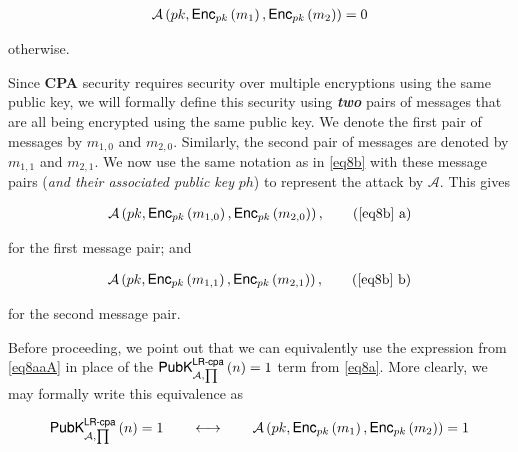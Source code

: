 \documentclass[../CryptoFinal.tex]{subfiles}
\begin{document}
\begin{flushleft}
\begin{align}
  \mathcal{A} \left( pk,  \text{{\fontfamily{phv}\selectfont Enc}}_{pk} \left( m_1 \right), \text{{\fontfamily{phv}\selectfont Enc}}_{pk} \left( m_2 \right) \right) = 0 \label{eq8aaB}
\end{align}

otherwise. \newline


Since \textbf{CPA} security requires security over multiple encryptions using the same public key, we will formally define this security using \textbf{\emph{two}} pairs of messages that are all being encrypted using the same public key.  We denote the first pair of messages by $m_{1, 0}$ and $m_{2, 0}$.  Similarly, the second pair of messages are denoted by  $m_{1, 1}$ and $m_{2, 1}$.  We now use the same notation as in \ref{eq8b} with these message pairs (\emph{and their associated public key} $ph$) to represent the attack by $\mathcal{A}$.  This gives

\begin{align}
  \mathcal{A} \left( pk,  \text{{\fontfamily{phv}\selectfont Enc}}_{pk} \left( m_{1, 0} \right), \text{{\fontfamily{phv}\selectfont Enc}}_{pk} \left( m_{2, 0} \right) \right), \tag{\ref{eq8b} a} \label{eq8b1}
\end{align}

for the first message pair; and 

\begin{align}
  \mathcal{A} \left( pk,  \text{{\fontfamily{phv}\selectfont Enc}}_{pk} \left( m_{1, 1} \right), \text{{\fontfamily{phv}\selectfont Enc}}_{pk} \left( m_{2, 1} \right) \right), \tag{\ref{eq8b} b} \label{eq8b2}
\end{align}
\setcounter{equation}{2}

for the second message pair. \newline


Before proceeding, we point out that we can equivalently use the expression from \ref{eq8aaA} in place of the $\text{{\fontfamily{phv}\selectfont PubK}}^{\text{{\fontfamily{phv}\selectfont LR-cpa}}}_{\mathcal{A}, \prod} \left( n \right) = 1$ term from \ref{eq8a}.  More clearly, we may formally write this equivalence as

\begin{align*}
  \text{{\fontfamily{phv}\selectfont PubK}}^{\text{{\fontfamily{phv}\selectfont LR-cpa}}}_{\mathcal{A}, \prod} \left( n \right) = 1  \qquad  \longleftrightarrow \qquad \mathcal{A} \left( pk,  \text{{\fontfamily{phv}\selectfont Enc}}_{pk} \left( m_1 \right), \text{{\fontfamily{phv}\selectfont Enc}}_{pk} \left( m_2 \right) \right) = 1
\end{align*}


\end{flushleft}
\end{document}

